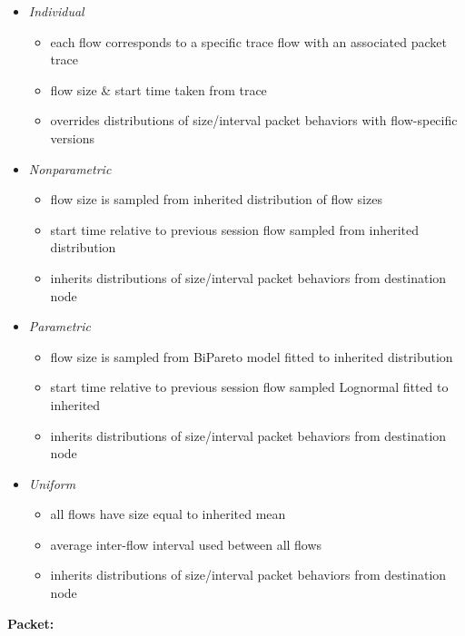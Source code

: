 \begin{itemize}
  \item \textit{Individual}
  \begin{itemize}
    \item each flow corresponds to a specific trace flow with an associated packet trace
    \item flow size \& start time taken from trace
    \item overrides distributions of size/interval packet behaviors with flow-specific versions
  \end{itemize}
  \item \textit{Nonparametric}
  \begin{itemize}
    \item flow size is sampled from inherited distribution of flow sizes
    \item start time relative to previous session flow sampled from inherited distribution
    \item inherits distributions of size/interval packet behaviors from destination node
  \end{itemize}
  \item \textit{Parametric}
  \begin{itemize}
    \item flow size is sampled from BiPareto model fitted to inherited distribution
    \item start time relative to previous session flow sampled Lognormal fitted to inherited
    \item inherits distributions of size/interval packet behaviors from destination node
  \end{itemize}
  \item \textit{Uniform}
  \begin{itemize}
    \item all flows have size equal to inherited mean
    \item average inter-flow interval used between all flows
    \item inherits distributions of size/interval packet behaviors from destination node
  \end{itemize}
\end{itemize}
\noindent
\textbf{Packet:}
